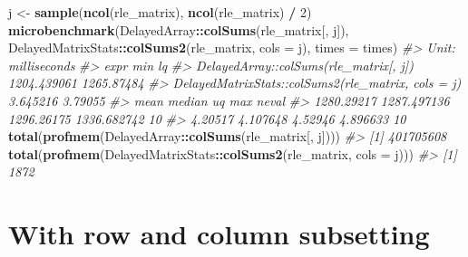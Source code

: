 \documentclass[]{book}
\newenvironment{Shaded}{\begin{snugshade}}{\end{snugshade}}
\newcommand{\KeywordTok}[1]{\textcolor[rgb]{0.13,0.29,0.53}{\textbf{#1}}}
\newcommand{\DataTypeTok}[1]{\textcolor[rgb]{0.13,0.29,0.53}{#1}}
\newcommand{\DecValTok}[1]{\textcolor[rgb]{0.00,0.00,0.81}{#1}}
\newcommand{\StringTok}[1]{\textcolor[rgb]{0.31,0.60,0.02}{#1}}
\newcommand{\CommentTok}[1]{\textcolor[rgb]{0.56,0.35,0.01}{\textit{#1}}}
\newcommand{\OperatorTok}[1]{\textcolor[rgb]{0.81,0.36,0.00}{\textbf{#1}}}
\newcommand{\NormalTok}[1]{#1}
\begin{document}
\begin{Shaded}
\begin{Highlighting}[]
\NormalTok{j <-}\StringTok{ }\KeywordTok{sample}\NormalTok{(}\KeywordTok{ncol}\NormalTok{(rle_matrix), }\KeywordTok{ncol}\NormalTok{(rle_matrix) }\OperatorTok{/}\StringTok{ }\DecValTok{2}\NormalTok{)}
\KeywordTok{microbenchmark}\NormalTok{(DelayedArray}\OperatorTok{::}\KeywordTok{colSums}\NormalTok{(rle_matrix[, j]),}
\NormalTok{               DelayedMatrixStats}\OperatorTok{::}\KeywordTok{colSums2}\NormalTok{(rle_matrix, }\DataTypeTok{cols =}\NormalTok{ j),}
               \DataTypeTok{times =}\NormalTok{ times)}
\CommentTok{#> Unit: milliseconds}
\CommentTok{#>                                                expr         min         lq}
\CommentTok{#>              DelayedArray::colSums(rle_matrix[, j]) 1204.439061 1265.87484}
\CommentTok{#>  DelayedMatrixStats::colSums2(rle_matrix, cols = j)    3.645216    3.79055}
\CommentTok{#>        mean      median         uq         max neval}
\CommentTok{#>  1280.29217 1287.497136 1296.26175 1336.682742    10}
\CommentTok{#>     4.20517    4.107648    4.52946    4.896633    10}
\KeywordTok{total}\NormalTok{(}\KeywordTok{profmem}\NormalTok{(DelayedArray}\OperatorTok{::}\KeywordTok{colSums}\NormalTok{(rle_matrix[, j])))}
\CommentTok{#> [1] 401705608}
\KeywordTok{total}\NormalTok{(}\KeywordTok{profmem}\NormalTok{(DelayedMatrixStats}\OperatorTok{::}\KeywordTok{colSums2}\NormalTok{(rle_matrix, }\DataTypeTok{cols =}\NormalTok{ j)))}
\CommentTok{#> [1] 1872}
\end{Highlighting}
\end{Shaded}

\section{With row and column
subsetting}\label{with-row-and-column-subsetting}
\end{document}
